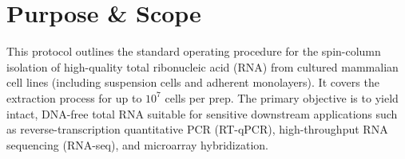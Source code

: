 \section{Purpose \& Scope}
This protocol outlines the standard operating procedure for the spin-column isolation of high-quality total ribonucleic acid (RNA) from cultured mammalian cell lines (including suspension cells and adherent monolayers). It covers the extraction process for up to $10^7$ cells per prep. The primary objective is to yield intact, DNA-free total RNA suitable for sensitive downstream applications such as reverse-transcription quantitative PCR (RT-qPCR), high-throughput RNA sequencing (RNA-seq), and microarray hybridization.
